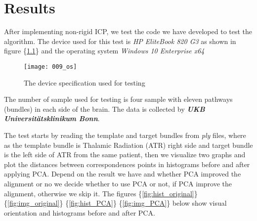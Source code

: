 \documentclass[../structure.tex]{subfiles}
\begin{document}
\chapter{Results}
\hspace{2em}After implementing non-rigid ICP, we test the code we have developed to test the algorithm. The device used for this test is \textit{HP EliteBook 820 G3} as shown in figure \{\ref{fig:OS}\} and the operating system \textit{Windows 10 Enterprise x64} 
\\
\begin{figure}[h!]
\centering
\texttt{[image: 009\_os]}
\captionsetup{justification=centering}
\caption{The device specification used for testing}
\label{fig:OS}
\end{figure}

The number of sample used for testing is four sample with eleven pathways (bundles) in each side of the brain. The data is collected by \textbf{\textit{UKB Universitätsklinikum Bonn}}. 
\begin{comment}
\begin{center}
\begin{table}[h!]
	\begin{tabular}{| c | c | c | c | c | c | c | c |}
	\hline
	1 & 2 & 3 & 4 & 5 & 6 & 7 & 8\\
	\hline
	(x,y,z) & (x,y,-z) & (x,-y,z) & (x,-y,-z) & (-x,-y,z) & (-x,y,-z) & (-x,y,z) & (-x,-y,-z)\\
	\hline
	\end{tabular}
\caption{$[-1,1]^3$ cube combination}
\label{table:cube}
\end{table}
\end{center}
\end{comment}

The test starts by reading the template and target bundles from \textit{ply} files, where as the template bundle is Thalamic Radiation (ATR) right side and target bundle is the left side of ATR from the same patient, then we visualize two graphs and plot the distances between correspondences points in histograms before and after applying PCA. Depend on the result we have and whether PCA improved the alignment or no we decide whether to use PCA or not, if PCA improve the alignment, otherwise we skip it. The figures \{\ref{fig:hist_original}\} \{\ref{fig:img_original}\} \{\ref{fig:hist_PCA}\} \{\ref{fig:img_PCA}\} below show visual orientation and histograms before and after PCA.

\pagebreak
\end{document}
